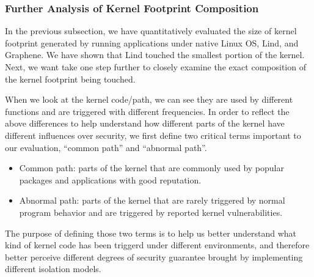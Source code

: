 \subsubsection{Further Analysis of Kernel Footprint Composition}

\par
In the previous subsection, we have quantitatively evaluated the size of kernel footprint generated by running applications under native Linux OS, Lind, and Graphene. We have shown that Lind touched the smallest portion of the kernel. Next, we want take one step further to closely examine the exact composition of the kernel footprint being touched. 

\par
When we look at the kernel code/path, we can see they are used by different functions and are triggered with different frequencies. 
In order to reflect the above differences to help understand how different parts of the kernel have different influences over security,
we first define two critical terms important to our evaluation, ``common path'' and ``abnormal path''.

\begin{itemize} 
  
  \item Common path: parts of the kernel that are commonly used by popular packages and applications with good reputation. 
  
  \item Abnormal path: parts of the kernel that are rarely triggered by normal program behavior and are triggered by reported kernel vulnerabilities. 
  
\end{itemize}

\par
The purpose of defining those two terms is to help us better understand what kind of kernel code has been triggerd under different environments, and therefore better perceive different degrees of security guarantee brought by implementing different isolation models. 


